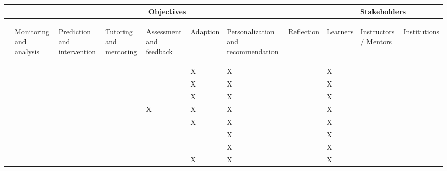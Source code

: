 \documentclass[11pt]{article}
\begin{document}
\begin{tabular}{l|lllllll|lll}
    & 
    \multicolumn{7}{c}{Objectives} &
    \multicolumn{3}{c}{Stakeholders} \\ 
\hline
    &
    \begin{sideways}Monitoring and analysis\end{sideways}& %
    \begin{sideways}Prediction and intervention\end{sideways}& %
    \begin{sideways}Tutoring and mentoring\end{sideways}& %
    \begin{sideways}Assessment and feedback\end{sideways}& %
    \begin{sideways}Adaption\end{sideways}& %
    \begin{sideways}Personalization and recommendation\end{sideways}& %
    \begin{sideways}Reflection\end{sideways}& %
    \begin{sideways}Learners\end{sideways}& %
    \begin{sideways}Instructors / Mentors \end{sideways}& %
    \begin{sideways}Institutions\end{sideways} \\ %
\hline
\cite{Brusilovsky2001}  &   &   &   &   & X & X &   & X &   &   \\ %
\cite{Brusilovsky2003}  &   &   &   &   & X & X &   & X &   &   \\ %
\cite{Brusilovsky2007}  &   &   &   &   & X & X &   & X &   &   \\ %
\cite{Weber2001}        &   &   &   & X & X & X &   & X &   &   \\
\cite{Henze2001}        &   &   &   &   & X & X &   & X &   &   \\
\cite{Farzan2004}       &   &   &   &   &   & X &   & X &   &   \\
\cite{Tang2005}         &   &   &   &   &   & X &   & X &   &   \\
\cite{Reategui2008}     &   &   &   &   & X & X &   & X &   &   \\

\end{tabular}
\end{document}
